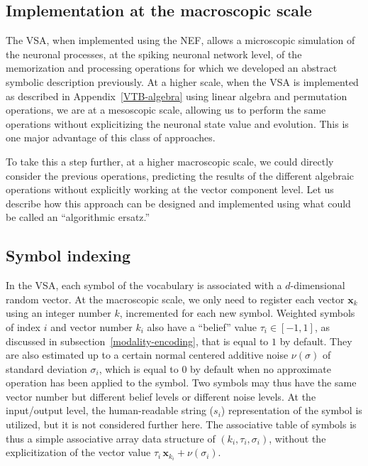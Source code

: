 \documentclass[sn-mathphys]{sn-jnl}
\begin{document}
\begin{appendices}
\clearpage

\section{Implementation at the macroscopic scale} \label{algorithmic-ersatz}

The VSA, when implemented using the NEF, allows a microscopic simulation of the neuronal processes, at the spiking neuronal network level, of the memorization and processing operations for which we developed an abstract symbolic description previously. At a higher scale, when the VSA is implemented as described in Appendix~\ref{VTB-algebra} using linear algebra and permutation operations, we are at a mesoscopic scale, allowing us to perform the same operations without explicitizing the neuronal state value and evolution. This is one major advantage of this class of approaches.

To take this a step further, at a higher macroscopic scale, we could directly consider the previous operations, predicting the results of the different algebraic operations without explicitly working at the vector component level. Let us describe how this approach can be designed and implemented using what could be called an ``algorithmic ersatz.''

\subsection*{Symbol indexing}

In the VSA, each symbol of the vocabulary is associated with a $d$-dimensional random vector. At the macroscopic scale, we only need to register each vector $\mathbf{x}_k$ using an integer number $k$, incremented for each new symbol. Weighted symbols of index $i$ and vector number $k_i$ also have a ``belief'' value $\tau_i \in [-1, 1]$, as discussed in subsection~\ref{modality-encoding}, that is equal to $1$ by default. They are also estimated up to a certain normal centered additive noise $\nu(\sigma)$ of standard deviation $\sigma_i$, which is equal to $0$ by default when no approximate operation has been applied to the symbol. Two symbols may thus have the same vector number but different belief levels or different noise levels. At the input/output level, the human-readable string ($s_i$) representation of the symbol is utilized, but it is not considered further here. The associative table of symbols is thus a simple associative array data structure of $(k_i, \tau_i, \sigma_i)$, without the explicitization of the vector value $\tau_i \, \mathbf{x}_{k_i} + \nu(\sigma_i)$.


\end{appendices}
\end{document}
